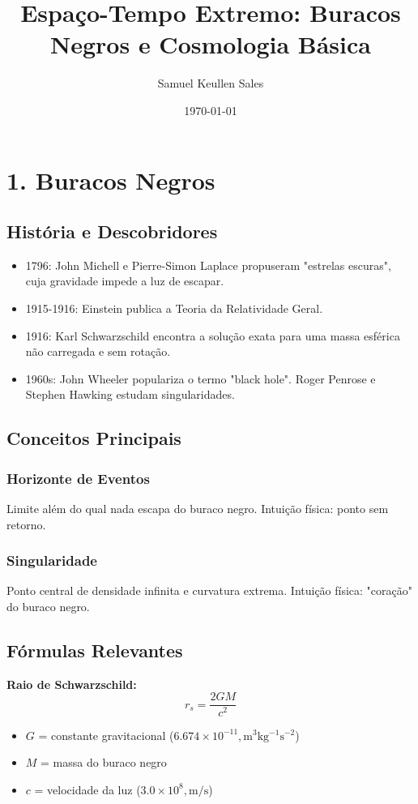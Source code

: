 \documentclass[12pt,a4paper]{article} \usepackage[utf8]{inputenc} \usepackage{amsmath, amssymb} \usepackage{geometry} \usepackage{hyperref} \usepackage{graphicx} \geometry{margin=1in} \title{Espaço-Tempo Extremo: Buracos Negros e Cosmologia Básica} \author{Samuel Keullen Sales} \date{\today}
\begin{document}
 \maketitle

\section*{1. Buracos Negros}

\subsection*{História e Descobridores} \begin{itemize} \item 1796: John Michell e Pierre-Simon Laplace propuseram "estrelas escuras", cuja gravidade impede a luz de escapar. \item 1915-1916: Einstein publica a Teoria da Relatividade Geral. \item 1916: Karl Schwarzschild encontra a solução exata para uma massa esférica não carregada e sem rotação. \item 1960s: John Wheeler populariza o termo "black hole". Roger Penrose e Stephen Hawking estudam singularidades. \end{itemize}

\subsection*{Conceitos Principais}

\subsubsection*{Horizonte de Eventos} Limite além do qual nada escapa do buraco negro. Intuição física: ponto sem retorno.

\subsubsection*{Singularidade} Ponto central de densidade infinita e curvatura extrema. Intuição física: "coração" do buraco negro.

\subsection*{Fórmulas Relevantes}

\textbf{Raio de Schwarzschild:} \begin{equation} r_s = \frac{2GM}{c^2} \end{equation} \begin{itemize} \item $G$ = constante gravitacional ($6.674 \times 10^{-11} , \mathrm{m^3 kg^{-1} s^{-2}}$) \item $M$ = massa do buraco negro \item $c$ = velocidade da luz ($3.0 \times 10^8 , \mathrm{m/s}$) \end{itemize}
\end{document}
